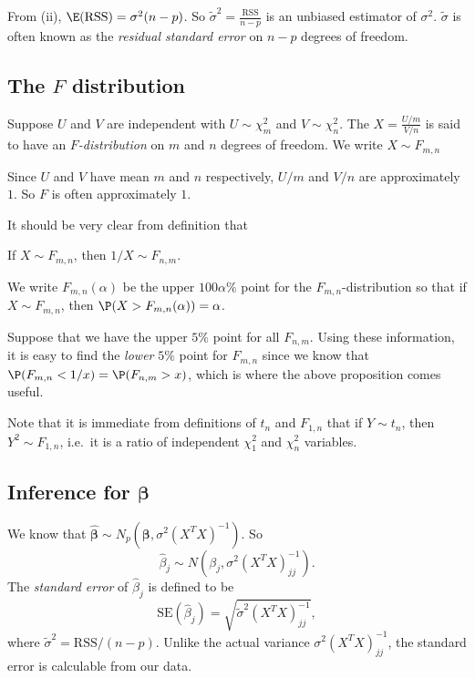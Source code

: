 \documentclass[a4paper]{article}
\begin{document}
From (ii), $\E(\mathrm{RSS}) = \sigma^2(n - p)$. So $\tilde{\sigma}^2 = \frac{\mathrm{RSS}}{n - p}$ is an unbiased estimator of $\sigma^2$. $\tilde{\sigma}$ is often known as the \emph{residual standard error} on $n - p$ degrees of freedom.
\subsection{The \texorpdfstring{$F$}{F} distribution}
\begin{defi}[$F$ distribution]
  Suppose $U$ and $V$ are independent with $U\sim \chi_m^2$ and $V\sim \chi_n^2$. The $X = \frac{U/m}{V/n}$ is said to have an \emph{$F$-distribution} on $m$ and $n$ degrees of freedom. We write $X\sim F_{m, n}$
\end{defi}
Since $U$ and $V$ have mean $m$ and $n$ respectively, $U/m$ and $V/n$ are approximately $1$. So $F$ is often approximately $1$.

It should be very clear from definition that
\begin{prop}
  If $X\sim F_{m, n}$, then $1/X\sim F_{n, m}$.
\end{prop}

We write $F_{m, n}(\alpha)$ be the upper $100\alpha\%$ point for the $F_{m, n}$-distribution so that if $X\sim F_{m, n}$, then $\P(X > F_{m, n}(\alpha)) = \alpha$.

Suppose that we have the upper $5\%$ point for all $F_{n, m}$. Using these information, it is easy to find the \emph{lower} $5\%$ point for $F_{m, n}$ since we know that $\P(F_{m, n} < 1/x) = \P(F_{n, m} > x)$, which is where the above proposition comes useful.

Note that it is immediate from definitions of $t_n$ and $F_{1, n}$ that if $Y\sim t_n$, then $Y^2\sim F_{1, n}$, i.e.\ it is a ratio of independent $\chi_1^2$ and $\chi_n^2$ variables.

\subsection{Inference for \texorpdfstring{$\boldsymbol\beta$}{beta}}
We know that $\hat{\boldsymbol\beta} \sim N_p(\boldsymbol\beta, \sigma^2(X^TX)^{-1})$. So
\[
  \hat{\beta}_j \sim N(\beta_j, \sigma^2(X^TX)^{-1}_{jj}).
\]
The \emph{standard error} of $\hat{\beta}_j$ is defined to be
\[
  \mathrm{SE}(\hat{\beta}_j) = \sqrt{\tilde{\sigma}^2 (X^TX)_{jj}^{-1}},
\]
where $\tilde{\sigma}^2 = \mathrm{RSS}/(n - p)$. Unlike the actual variance $\sigma^2(X^TX)^{-1}_{jj}$, the standard error is calculable from our data.
\end{document}
